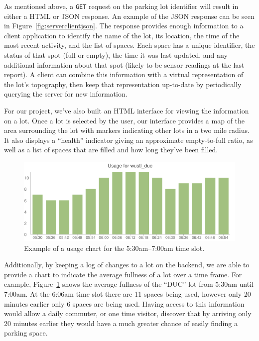 \documentclass{acm_proc}
\begin{document}
As mentioned above, a \texttt{GET} request on the parking lot identifier
will result in either a HTML or JSON response.
An example of the JSON response can be seen in
Figure~\ref{fig:serverclientjson}.
The response provides enough information to a client application to
identify the name of the lot, its location, the time of the most recent
activity, and the list of spaces.
Each space has a unique identifier, the status of that spot (full or
empty), the time it was last updated, and any additional information about
that spot (likely to be sensor readings at the last report).
A client can combine this information with a virtual representation of the
lot's topography, then keep that representation up-to-date by periodically
querying the server for new information.

For our project, we've also built an HTML interface for viewing the
information on a lot.
Once a lot is selected by the user, our interface provides a map of the
area surrounding the lot with markers indicating other lots in a two mile
radius.
It also displays a ``health'' indicator giving an approximate empty-to-full
ratio, as well as a list of spaces that are filled and how long they've
been filled.

\begin{figure}
    \begin{center}
		\includegraphics[width=\columnwidth]{figures/fullness-chart}
	\end{center}
	\caption{Example of a usage chart for the 5:30am--7:00am time slot.}
	\label{fig:fullness-chart}
\end{figure}

Additionally, by keeping a log of changes to a lot on the backend, we are
able to provide a chart to indicate the average fullness of a lot over a
time frame.
For example, Figure~\ref{fig:fullness-chart} shows the average fullness of
the ``DUC'' lot from 5:30am until 7:00am.
At the 6:06am time slot there are 11 spaces being used, however only 20
minutes earlier only 6 spaces are being used.
Having access to this information would allow a daily commuter, or one time
visitor, discover that by arriving only 20 minutes earlier they would have
a much greater chance of easily finding a parking space.
\end{document}
